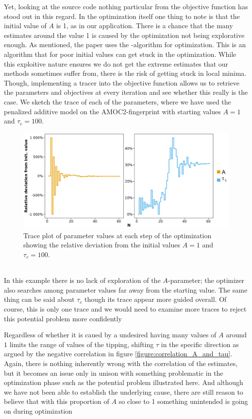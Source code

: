 Yet, looking at the source code nothing particular from the objective function has stood out in this regard. In the optimization itself one thing to note is that the initial value of $A$ is 1, as in our application. There is a chance that the many estimates around the value 1 is caused by the optimization not being explorative enough. As mentioned, the paper uses the -algorithm for optimization. This is an algorithm that for poor initial values can get stuck in the optimization. While this exploitive nature ensures we do not get the extreme estimates that our methods sometimes suffer from, there is the risk of getting stuck in local minima. Though, implementing a tracer into the objective function allows us to retrieve the parameters and objectives at every iteration and see whether this really is the case. We sketch the trace of each of the parameters, where we have used the penalized additive model on the AMOC2-fingerprint with starting values $A = 1$ and $\tau_c = 100$. 
\begin{figure}[h!]
\begin{center}
    \includegraphics[scale = .075]{figures/trace_plot.jpeg}
    \caption{Trace plot of parameter values at each step of the optimization showing the relative deviation from the initial values $A = 1$ and $\tau_c = 100$.}
    \label{figure:trace_plot}
\end{center}
\end{figure}\\
In this example there is no lack of exploration of the $A$-parameter; the optimizer also searches among parameter values far away from the starting value. The same thing can be said about $\tau_c$ though its trace appear more guided overall. Of course, this is only one trace and we would need to examine more traces to reject this potential problem more confidently

Regardless of whether it is caued by a undesired having many values of $A$ around $1$ limits the range of values of the tipping, shifting $\tau$ in the specific direction as argued by the negative correlation in figure \ref{figure:correlation_A_and_tau}. Again, there is nothing inherently wrong with the correlation of the estimates, but it becomes an issue only in unison with something problematic in the optimization phase such as the potential problem illustrated here. And although we have not been able to establish the underlying cause, there are still reason to believe that with this proportion of $A$ so close to 1 something unintended is going on during optimization

